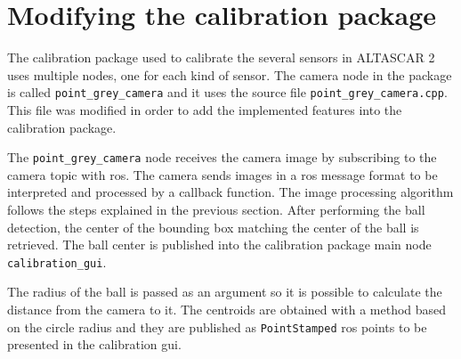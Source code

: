 \section{Modifying the calibration package}

The calibration package used to calibrate the several sensors in ALTASCAR 2 uses multiple nodes, one for each kind of sensor. The camera node in the package is called \texttt{point\_grey\_camera} and it uses the source file \texttt{point\_grey\_camera.cpp}. This file was modified in order to add the implemented features into the calibration package. 

The \texttt{point\_grey\_camera} node receives the camera image by subscribing to the camera topic with \gls{ros}. The camera sends images in a \gls{ros} message format to be interpreted and processed by a callback function. The image processing algorithm follows the steps explained in the previous section. After performing the ball detection, the center of the bounding box matching the center of the ball is retrieved. The ball center is published into the calibration package main node \texttt{calibration\_gui}.

The radius of the ball is passed as an argument so it is possible to calculate the distance from the camera to it. The centroids are obtained with a method based on the circle radius and they are published as \texttt{PointStamped} \gls{ros} points to be presented in the calibration \gls{gui}. 















 

